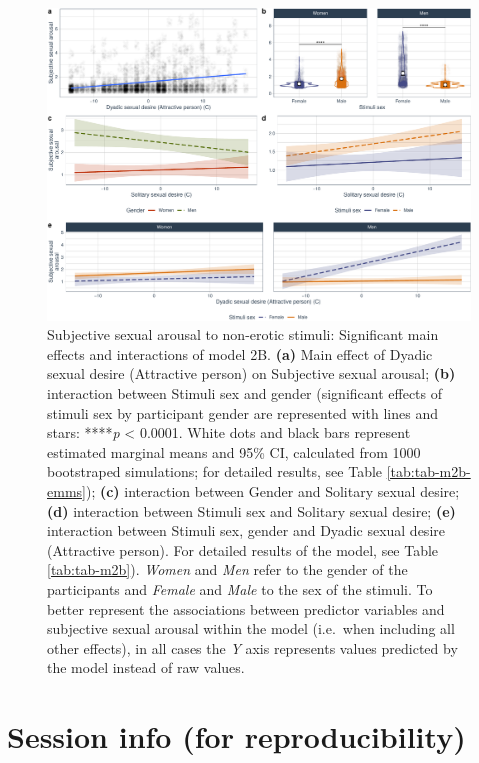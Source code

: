 \documentclass[
  bookmarksnumbered]{article}
\begin{document}
\begin{figure}
\centering
\includegraphics{Deseo_excitacion_sexual_files/figure-latex/fig-h2b-1.pdf}
\caption{\label{fig:fig-h2b}Subjective sexual arousal to non-erotic stimuli: Significant main effects and interactions of model 2B. \textbf{(a)} Main effect of Dyadic sexual desire (Attractive person) on Subjective sexual arousal; \textbf{(b)} interaction between Stimuli sex and gender (significant effects of stimuli sex by participant gender are represented with lines and stars: ****\emph{p} \textless{} 0.0001. White dots and black bars represent estimated marginal means and 95\% CI, calculated from 1000 bootstraped simulations; for detailed results, see Table \ref{tab:tab-m2b-emms}); \textbf{(c)} interaction between Gender and Solitary sexual desire; \textbf{(d)} interaction between Stimuli sex and Solitary sexual desire; \textbf{(e)} interaction between Stimuli sex, gender and Dyadic sexual desire (Attractive person). For detailed results of the model, see Table \ref{tab:tab-m2b}). \emph{Women} and \emph{Men} refer to the gender of the participants and \emph{Female} and \emph{Male} to the sex of the stimuli. To better represent the associations between predictor variables and subjective sexual arousal within the model (i.e.~when including all other effects), in all cases the \emph{Y} axis represents values predicted by the model instead of raw values.}
\end{figure}

\hypertarget{session}{%
\section{Session info (for reproducibility)}\label{session}}
\end{document}
